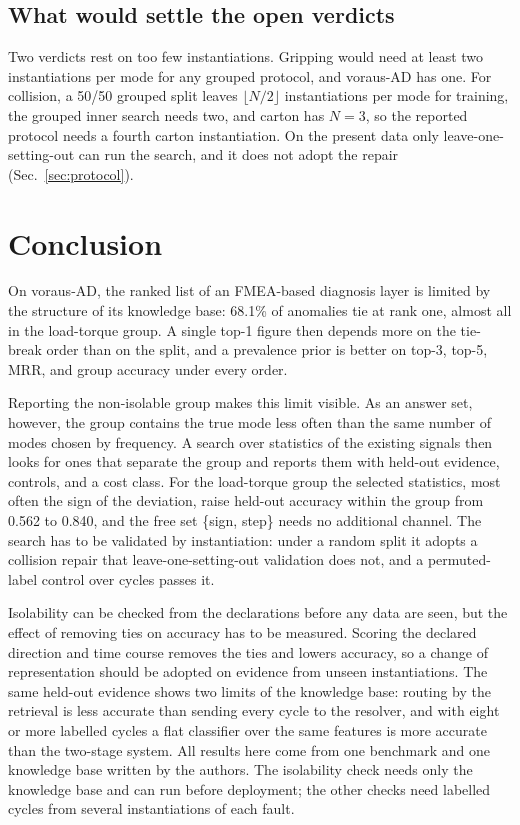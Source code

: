 \documentclass{ifacconf}
\begin{document}
\subsection{What would settle the open verdicts}

Two verdicts rest on too few instantiations. Gripping would need at least two
instantiations per mode for any grouped protocol, and voraus-AD has one. For
collision, a 50/50 grouped split leaves $\lfloor N/2 \rfloor$ instantiations
per mode for training, the grouped inner search needs two, and carton has
$N = 3$, so the reported protocol needs a fourth carton instantiation. On the
present data only leave-one-setting-out can run the search, and it does not
adopt the repair (Sec.~\ref{sec:protocol}). 

\section{Conclusion}

On voraus-AD, the ranked list of an FMEA-based diagnosis layer is limited by the
structure of its knowledge base: 68.1\% of anomalies tie at rank one, almost all
in the load-torque group. A single top-1 figure then depends more on the
tie-break order than on the split, and a prevalence prior is better on top-3,
top-5, MRR, and group accuracy under every order.

Reporting the non-isolable group makes this limit visible. As an answer set,
however, the group contains the true mode less often than the same number of
modes chosen by frequency. A search over statistics of the existing signals then
looks for ones that separate the group and reports them with held-out evidence,
controls, and a cost class. For the load-torque group the selected statistics,
most often the sign of the deviation, raise held-out accuracy within the group
from 0.562 to 0.840, and the free set \{sign, step\} needs no additional
channel. The search has to be validated by instantiation: under a random split
it adopts a collision repair that leave-one-setting-out validation does not, and
a permuted-label control over cycles passes it.

Isolability can be checked from the declarations before any data are seen, but
the effect of removing ties on accuracy has to be measured. Scoring the declared
direction and time course removes the ties and lowers accuracy, so a change of
representation should be adopted on evidence from unseen instantiations. The
same held-out evidence shows two limits of the knowledge base: routing by the
retrieval is less accurate than sending every cycle to the resolver, and with
eight or more labelled cycles a flat classifier over the same features is more
accurate than the two-stage system. All results here come from one benchmark
and one knowledge base written by the authors. The isolability check needs only
the knowledge base and can run before deployment; the other checks need
labelled cycles from several instantiations of each fault.
\end{document}
